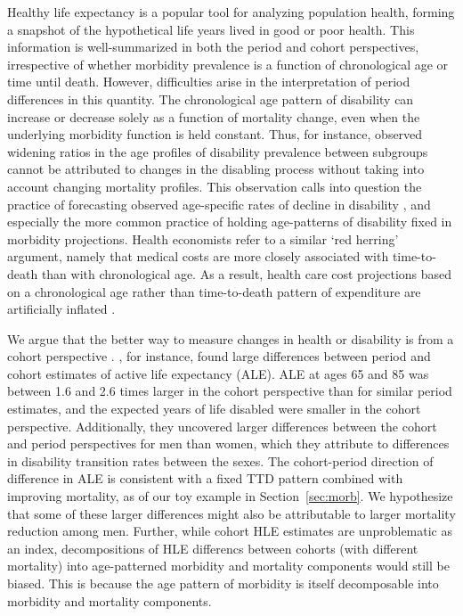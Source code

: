 \documentclass[11pt,oneside,a4paper]{article} %
\begin{document}
Healthy life expectancy is a popular tool for analyzing population health, forming a snapshot of the hypothetical life years lived in good or poor health. This information is well-summarized in both the period and
cohort perspectives, irrespective of whether morbidity prevalence is a function of
chronological age or time until death. However, difficulties arise in the
interpretation of period differences in this quantity. The chronological age
pattern of disability can increase or decrease solely as a function of mortality
change, even when the underlying morbidity function is held constant. Thus, for
instance, observed widening ratios in the age profiles of disability prevalence
between subgroups \citep{Crimmins2001} cannot be attributed to changes in the
disabling process without taking into account changing mortality profiles. This
observation calls into question the practice of forecasting observed
age-specific rates of decline in disability \citep{Manton2006,Khaw1999}, and
especially the more common practice of holding age-patterns of disability fixed
in morbidity projections.
Health economists refer to a similar `red herring' argument, namely that medical costs are more closely associated with time-to-death than with chronological age. As a result, health
care cost projections based on a chronological age rather than time-to-death
pattern of expenditure are artificially inflated \citep{Zweifel1999,Geue2014}.

We argue that the better way to measure changes in health or disability
is from a cohort perspective \citep{Manton2000,Manton2008,Christensen2013}.
\citet{Manton2000}, for instance, found large differences between period and
cohort estimates of active life expectancy (ALE). ALE at ages 65 and 85 was
between 1.6 and 2.6 times larger in the cohort perspective than for similar
period estimates, and the expected years of life disabled were smaller in the
cohort perspective.
Additionally, they uncovered larger differences between the cohort and period
perspectives for men than women, which they attribute to differences in
disability transition rates between the sexes. The cohort-period direction of difference in ALE is consistent with a fixed TTD pattern combined with improving mortality, as of our toy example in Section~\ref{sec:morb}. We hypothesize that some of these
larger differences might also be attributable to larger mortality reduction
among men. Further, while cohort HLE estimates are unproblematic as an index,
decompositions of HLE differencs between cohorts (with different mortality) into age-patterned morbidity and
mortality components would still be biased. This is because the age pattern of
morbidity is itself decomposable into morbidity and
mortality components.  
\end{document}
